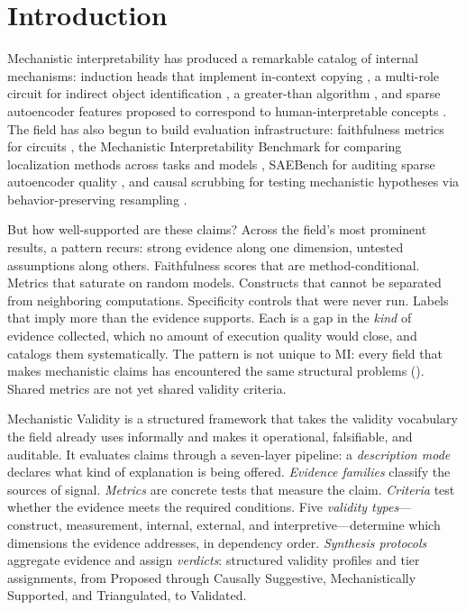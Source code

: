 \documentclass{article}
\begin{document}
\section{Introduction}
\label{sec:intro}

Mechanistic interpretability has produced a remarkable catalog of internal mechanisms:
induction heads that implement in-context copying \citep{olsson2022context}, a multi-role
circuit for indirect object identification \citep{wang2023interpretability}, a greater-than
algorithm \citep{hanna2023greater}, and sparse autoencoder features proposed to correspond
to human-interpretable concepts \citep{cunningham2023sparse, bricken2024monosemanticity}. The field has also begun to
build evaluation infrastructure: faithfulness metrics for circuits
\citep{miller2024transformer}, the Mechanistic Interpretability Benchmark for comparing
localization methods across tasks and models \citep{mueller2025mib}, SAEBench for auditing
sparse autoencoder quality \citep{karvonen2025saebench}, and causal scrubbing for testing
mechanistic hypotheses via behavior-preserving resampling \citep{chan2022causal}.

But how well-supported are these claims? Across the field's most prominent results, a pattern recurs: strong evidence along one dimension, untested assumptions along others. Faithfulness scores that are method-conditional. Metrics that saturate on random models. Constructs that cannot be separated from neighboring computations. Specificity controls that were never run. Labels that imply more than the evidence supports. Each is a gap in the \emph{kind} of evidence collected, which no amount of execution quality would close, and  catalogs them systematically. The pattern is not unique to MI: every field that makes mechanistic claims has encountered the same structural problems (). Shared metrics are not yet shared validity criteria.

Mechanistic Validity is a structured framework that takes the validity vocabulary the field already uses informally and makes it operational, falsifiable, and auditable. It evaluates claims through a seven-layer pipeline: a \emph{description mode} declares what kind of explanation is being offered. \emph{Evidence families} classify the sources of signal. \emph{Metrics} are concrete tests that measure the claim. \emph{Criteria} test whether the evidence meets the required conditions. Five \emph{validity types}---construct, measurement, internal, external, and interpretive---determine which dimensions the evidence addresses, in dependency order. \emph{Synthesis protocols} aggregate evidence and assign \emph{verdicts}: structured validity profiles and tier assignments, from Proposed through Causally Suggestive, Mechanistically Supported, and Triangulated, to Validated.
\end{document}
